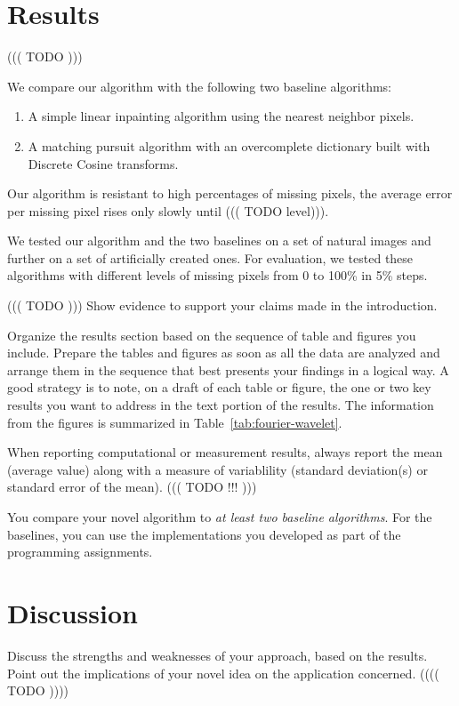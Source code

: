 \documentclass[10pt,conference,compsocconf]{IEEEtran}
\begin{document}
\section{Results}

 ((( TODO )))
 
 We compare our algorithm with the following two baseline algorithms:
 \begin{enumerate}
	 \item A simple linear inpainting algorithm using the nearest neighbor pixels.
	 \item A matching pursuit algorithm \cite{matchingpursuit93} with an overcomplete dictionary built with Discrete Cosine transforms.
 \end{enumerate}
 
  Our algorithm is resistant to high percentages of missing pixels, the average error per missing pixel rises only slowly until ((( TODO level))). 
 
We tested our algorithm and the two baselines on a set of natural images and further on a set of artificially created ones. 
For evaluation, we tested these algorithms with different levels of missing pixels from 0 to 100\% in 5\% steps.


  
 ((( TODO )))
  Show evidence to support your claims made in the
  introduction. 
  
Organize the results section based on the sequence of table and
figures you include. Prepare the tables and figures as soon as all
the data are analyzed and arrange them in the sequence that best
presents your findings in a logical way. A good strategy is to note,
on a draft of each table or figure, the one or two key results you
want to address in the text portion of the results.
The information from the figures is
summarized in Table~\ref{tab:fourier-wavelet}.

When reporting computational or measurement results, always
report the mean (average value) along with a measure of variablility
(standard deviation(s) or standard error of the mean). ((( TODO !!! )))

You compare your novel algorithm to \emph{at least two baseline
  algorithms}. For the baselines, you can use the implementations you
developed as part of the programming assignments.

\section{Discussion}
  Discuss the strengths and weaknesses of your
  approach, based on the results. Point out the implications of your  
  novel idea on the application concerned. (((( TODO ))))
\end{document}
